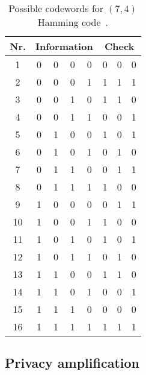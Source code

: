 \begin{table}[htb]
	\centering
	\begin{tabular}{c|cccc|ccc}
		\toprule
		Nr. & \multicolumn{4}{c}{Information} & \multicolumn{3}{c}{Check} \\
		\midrule
			1 & 0 & 0 & 0 & 0 & 0 & 0 & 0 \\
			2 & 0 & 0 & 0 & 1 & 1 & 1 & 1 \\
			3 & 0 & 0 & 1 & 0 & 1 & 1 & 0 \\
			4 & 0 & 0 & 1 & 1 & 0 & 0 & 1 \\
			5 & 0 & 1 & 0 & 0 & 1 & 0 & 1 \\
			6 & 0 & 1 & 0 & 1 & 0 & 1 & 0 \\
			7 & 0 & 1 & 1 & 0 & 0 & 1 & 1 \\
			8 & 0 & 1 & 1 & 1 & 1 & 0 & 0 \\
			9 & 1 & 0 & 0 & 0 & 0 & 1 & 1 \\
			10 & 1 & 0 & 0 & 1 & 1 & 0 & 0 \\
			11 & 1 & 0 & 1 & 0 & 1 & 0 & 1 \\
			12 & 1 & 0 & 1 & 1 & 0 & 1 & 0 \\
			13 & 1 & 1 & 0 & 0 & 1 & 1 & 0 \\
			14 & 1 & 1 & 0 & 1 & 0 & 0 & 1 \\
			15 & 1 & 1 & 1 & 0 & 0 & 0 & 0 \\
			16 & 1 & 1 & 1 & 1 & 1 & 1 & 1 \\
		\bottomrule
	\end{tabular}
	\caption{Possible codewords for $(7,4)$ Hamming code~\cite[p.~109]{Mildenberger2013}.}\label{tab:hamming_code}
\end{table}

\subsection{Privacy amplification}


\cite{Bennett1995} %